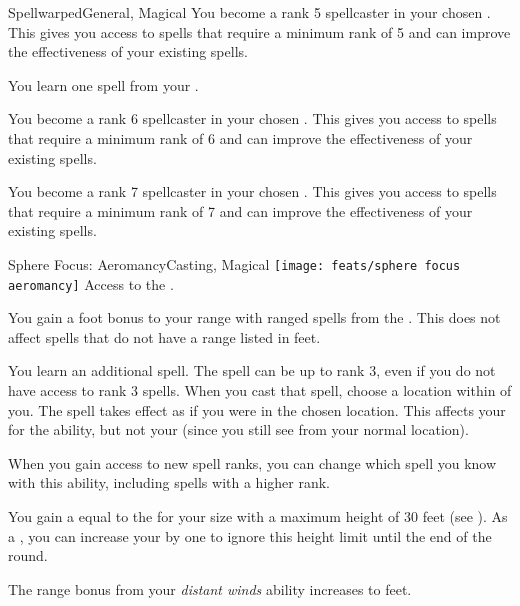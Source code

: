 \begin{magicalfeat}{Spellwarped}{General, Magical}
         You become a rank 5 spellcaster in your chosen .
        This gives you access to spells that require a minimum rank of 5 and can improve the effectiveness of your existing spells.

         You learn one spell from your .

         You become a rank 6 spellcaster in your chosen .
        This gives you access to spells that require a minimum rank of 6 and can improve the effectiveness of your existing spells.

         You become a rank 7 spellcaster in your chosen .
        This gives you access to spells that require a minimum rank of 7 and can improve the effectiveness of your existing spells.
    \end{magicalfeat}

    \begin{magicalfeat}{Sphere Focus: Aeromancy}{Casting, Magical}
        \texttt{[image: feats/sphere focus aeromancy]}
        \featpre Access to the  .

         You gain a  foot bonus to your range with ranged spells from the  .
        This does not affect spells that do not have a range listed in feet.

         You learn an additional spell.
        The spell can be up to rank 3, even if you do not have access to rank 3 spells.
        When you cast that spell, choose a location within \shortrange of you.
        The spell takes effect as if you were in the chosen location.
        This affects your  for the ability, but not your  (since you still see from your normal location).

        When you gain access to new spell ranks, you can change which spell you know with this ability, including spells with a higher rank.

         You gain a  equal to the  for your size with a maximum height of 30 feet (see ).
        As a , you can increase your  by one to ignore this height limit until the end of the round.

         The range bonus from your \textit{distant winds} ability increases to  feet.
    \end{magicalfeat}

